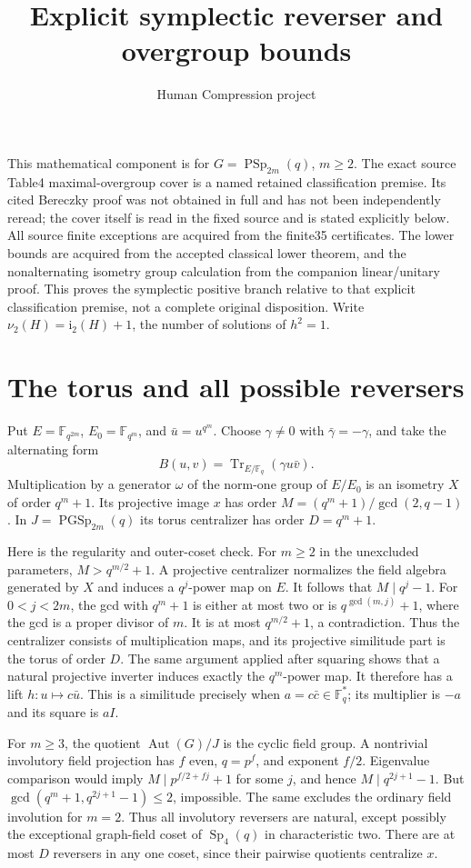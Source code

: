 \documentclass[10pt]{article}
\title{Explicit symplectic reverser and overgroup bounds}
\author{Human Compression project}\date{}
\newcommand{\ii}{\mathrm i_2}\newcommand{\nuu}{\nu_2}\newcommand{\F}{\mathbb F}\newcommand{\GL}{\operatorname{GL}}\newcommand{\GU}{\operatorname{GU}}\newcommand{\Sp}{\operatorname{Sp}}\newcommand{\PSp}{\operatorname{PSp}}\newcommand{\PGSp}{\operatorname{PGSp}}\newcommand{\Aut}{\operatorname{Aut}}
\begin{document}
\maketitle
This mathematical component is for $G=\PSp_{2m}(q)$, $m\ge2$.
The exact source Table4 maximal-overgroup cover is a named retained
classification premise. Its cited Bereczky proof was not obtained in full
and has not been independently reread; the cover itself is read in the
fixed source and is stated explicitly below.
All source finite exceptions are acquired from the finite35 certificates.
The lower bounds are acquired from the accepted classical lower theorem,
and the nonalternating isometry group calculation from the companion
linear/unitary proof. This proves the symplectic positive branch relative to that explicit
classification premise, not a complete original disposition.
Write $\nuu(H)=\ii(H)+1$, the number of solutions of $h^2=1$.

\section{The torus and all possible reversers}
Put $E=\F_{q^{2m}}$, $E_0=\F_{q^m}$, and $\bar u=u^{q^m}$. Choose
$\gamma\ne0$ with $\bar\gamma=-\gamma$, and take the alternating form
\[
 B(u,v)=\operatorname{Tr}_{E/\F_q}(\gamma u\bar v).
\]
Multiplication by a generator $\omega$ of the norm-one group of $E/E_0$
is an isometry $X$ of order $q^m+1$. Its projective image $x$ has order
$M=(q^m+1)/\gcd(2,q-1)$. In $J=\PGSp_{2m}(q)$ its torus centralizer
has order $D=q^m+1$.

Here is the regularity and outer-coset check. For $m\ge2$ in the unexcluded
parameters, $M>q^{m/2}+1$. A projective centralizer normalizes the field
algebra generated by $X$ and induces a $q^j$-power map on $E$. It follows
that $M\mid q^j-1$. For $0<j<2m$, the gcd with $q^m+1$ is either at most
two or is $q^{\gcd(m,j)}+1$, where the gcd is a proper divisor of $m$.
It is at most $q^{m/2}+1$, a contradiction. Thus the centralizer consists
of multiplication maps, and its projective similitude part is the torus of
order $D$. The same argument applied after squaring shows that a natural
projective inverter induces exactly the $q^m$-power map. It therefore has a
lift $h:u\mapsto c\bar u$. This is a similitude precisely when
$a=c\bar c\in\F_q^*$; its multiplier is $-a$ and its square is $aI$.

For $m\ge3$, the quotient $\Aut(G)/J$ is the cyclic field group. A
nontrivial involutory field projection has $f$ even, $q=p^f$, and exponent
$f/2$. Eigenvalue comparison would imply
$M\mid p^{f/2+fj}+1$ for some $j$, and hence $M\mid q^{2j+1}-1$.
But $\gcd(q^m+1,q^{2j+1}-1)\le2$, impossible. The same excludes the
ordinary field involution for $m=2$. Thus all involutory reversers are
natural, except possibly the exceptional graph-field coset of $\Sp_4(q)$
in characteristic two. There are at most $D$ reversers in any one coset,
since their pairwise quotients centralize $x$.
\end{document}
